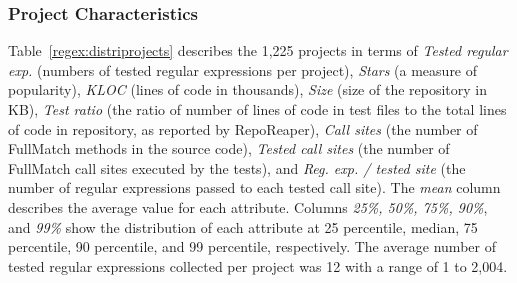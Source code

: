 \subsubsection{Project Characteristics}
Table~\ref{regex:distriprojects} describes the 1,225 projects in terms of {\em Tested regular exp.} (numbers of tested regular expressions per project), {\em Stars} (a measure of popularity), {\em KLOC} (lines of code in thousands), {\em Size} (size of the repository in KB),  {\em Test ratio} (the ratio of number of lines of code in test files to the total lines of code in repository, as reported by RepoReaper), \emph{Call sites} (the number of FullMatch methods in the source code), \emph{Tested call sites} (the number of FullMatch call sites executed by the tests), and \emph{Reg. exp. / tested site} (the number of regular expressions passed to each tested call site). 
The \emph{mean} column describes the average value for each attribute. Columns {\em 25\%, 50\%, 75\%, 90\%}, and {\em 99\%} show the distribution of each attribute at 25 percentile, median, 75 percentile, 90 percentile, and 99 percentile, respectively. 
The average number of tested regular expressions collected per project was 12 with a range of 1 to 2,004. %

 

